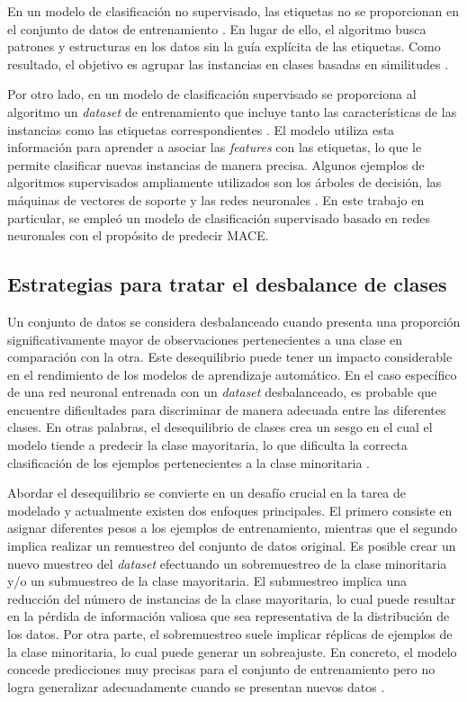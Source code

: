 En un modelo de clasificación no supervisado, las etiquetas no se proporcionan en el conjunto de 
datos de entrenamiento \citep{CITE:34}. En lugar de ello, el algoritmo busca patrones y estructuras 
en los datos sin la guía explícita de las etiquetas. Como resultado, el objetivo es agrupar las instancias en 
clases basadas en similitudes \citep{CITE:33}.

Por otro lado, en un modelo de clasificación supervisado se proporciona al algoritmo un \emph{dataset} de 
entrenamiento que incluye tanto las características de las instancias como las etiquetas correspondientes 
\citep{CITE:33}. El modelo utiliza esta información para aprender a asociar las \emph{features} con las 
etiquetas, lo que le permite clasificar nuevas instancias de manera precisa. Algunos ejemplos de algoritmos 
supervisados ampliamente utilizados son los árboles de decisión, las máquinas de vectores de soporte y 
las redes neuronales \citep{CITE:34}. En este trabajo en particular, se empleó un modelo de clasificación 
supervisado basado en redes neuronales con el propósito de predecir MACE.

\subsection{Estrategias para tratar el desbalance de clases}

Un conjunto de datos se considera desbalanceado cuando presenta una proporción significativamente mayor 
de observaciones pertenecientes a una clase en comparación con la otra. Este desequilibrio puede tener 
un impacto considerable en el rendimiento de los modelos de aprendizaje automático. En el caso específico 
de una red neuronal entrenada con un \emph{dataset} desbalanceado, es probable que encuentre dificultades 
para discriminar de manera adecuada entre las diferentes clases. En otras palabras, el desequilibrio de 
clases crea un sesgo en el cual el modelo tiende a predecir la clase mayoritaria, lo que dificulta la 
correcta clasificación de los ejemplos pertenecientes a la clase minoritaria \citep{CITE:36} \citep{CITE:37}. 

Abordar el desequilibrio se convierte en un desafío crucial en la tarea de modelado y actualmente existen 
dos enfoques principales. El primero consiste en asignar diferentes pesos a los ejemplos de entrenamiento, 
mientras que el segundo implica realizar un remuestreo del conjunto de datos original. Es posible crear 
un nuevo muestreo del \emph{dataset} efectuando un sobremuestreo de la clase minoritaria y/o un submuestreo 
de la clase mayoritaria. El submuestreo implica una reducción del número de instancias de la clase mayoritaria, 
lo cual puede resultar en la pérdida de información valiosa que sea representativa de la distribución de los 
datos. Por otra parte, el sobremuestreo suele implicar réplicas de ejemplos de la clase minoritaria, lo cual 
puede generar un sobreajuste. En concreto, el modelo concede predicciones muy precisas para el conjunto de 
entrenamiento pero no logra generalizar adecuadamente cuando se presentan nuevos datos \citep{CITE:37}. 

